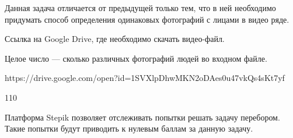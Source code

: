 
Данная задача отличается от предыдущей только тем, что в ней необходимо придумать способ определения одинаковых фотографий с лицами в видео ряде.


Ссылка на Google Drive, где необходимо скачать видео-файл.  

\outputfmtSection

Целое число --- сколько различных фотографий людей во входном файле.

\exampleSection


\footnotesize
\begin{myverbbox}[\small]{\vinput}
https://drive.google.com/open?id=1SVXlpDhwMKN2oDAes0u47vkQs4sKt7yf
\end{myverbbox}
\begin{myverbbox}[\small]{\voutput}
110
\end{myverbbox}
\normalsize

\commentsSection
Платформа Stepik позволяет отслеживать попытки решать задачу перебором. Такие попытки будут приводить к нулевым баллам за данную задачу.

